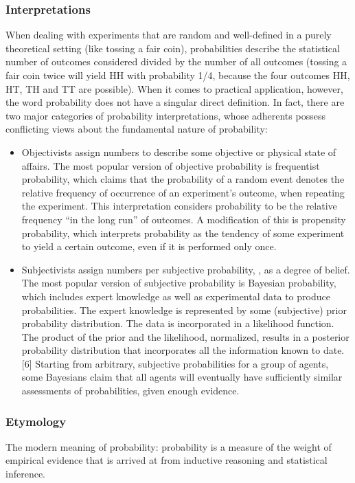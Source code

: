 \subsubsection{Interpretations}
When dealing with experiments that are random and well-defined in a purely theoretical setting (like tossing a fair coin), probabilities describe the statistical number of outcomes considered divided by the number of all outcomes (tossing a fair coin twice will yield HH with probability 1/4, because the four outcomes HH, HT, TH and TT are possible). When it comes to practical application, however, the word probability does not have a singular direct definition. In fact, there are two major categories of probability interpretations, whose adherents possess conflicting views about the fundamental nature of probability:
\begin{itemize}
\item Objectivists assign numbers to describe some objective or physical state of affairs. The most popular version of objective probability is frequentist probability, which claims that the probability of a random event denotes the relative frequency of occurrence of an experiment's outcome, when repeating the experiment. This interpretation considers probability to be the relative frequency ``in the long run'' of outcomes. A modification of this is propensity probability, which interprets probability as the tendency of some experiment to yield a certain outcome, even if it is performed only once.
%
\item Subjectivists assign numbers per subjective probability, \ie, as a degree of belief. The most popular version of subjective probability is Bayesian probability, which includes expert knowledge as well as experimental data to produce probabilities. The expert knowledge is represented by some (subjective) prior probability distribution. The data is incorporated in a likelihood function. The product of the prior and the likelihood, normalized, results in a posterior probability distribution that incorporates all the information known to date.[6] Starting from arbitrary, subjective probabilities for a group of agents, some Bayesians claim that all agents will eventually have sufficiently similar assessments of probabilities, given enough evidence.
\end{itemize}


\subsubsection{Etymology}
The modern meaning of probability: probability is a measure of the weight of empirical evidence that is arrived at from inductive reasoning and statistical inference.


